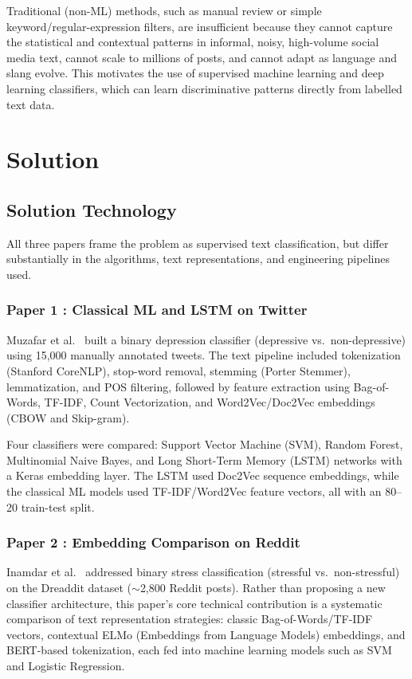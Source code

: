 \documentclass[a4paper,12pt]{article}
\begin{document}
Traditional (non-ML) methods, such as manual review or simple keyword/regular-expression filters, are insufficient because they cannot capture the statistical and contextual patterns in informal, noisy, high-volume social media text, cannot scale to millions of posts, and cannot adapt as language and slang evolve. This motivates the use of supervised machine learning and deep learning classifiers, which can learn discriminative patterns directly from labelled text data.

\section{Solution}
\subsection{Solution Technology}
All three papers frame the problem as supervised text classification, but differ substantially in the algorithms, text representations, and engineering pipelines used.

\subsubsection*{Paper 1 : Classical ML and LSTM on Twitter}

Muzafar et al.~\cite{muzafar2023} built a binary depression classifier (depressive vs.\ non-depressive) using 15,000 manually annotated tweets. The text pipeline included tokenization (Stanford CoreNLP), stop-word removal, stemming (Porter Stemmer), lemmatization, and POS filtering, followed by feature extraction using Bag-of-Words, TF-IDF, Count Vectorization, and Word2Vec/Doc2Vec embeddings (CBOW and Skip-gram).

Four classifiers were compared: Support Vector Machine (SVM), Random Forest, Multinomial Naive Bayes, and Long Short-Term Memory (LSTM) networks with a Keras embedding layer. The LSTM used Doc2Vec sequence embeddings, while the classical ML models used TF-IDF/Word2Vec feature vectors, all with an 80--20 train-test split.

\subsubsection*{Paper 2 : Embedding Comparison on Reddit}

Inamdar et al.~\cite{inamdar2023} addressed binary stress classification (stressful vs.\ non-stressful) on the Dreaddit dataset ($\sim$2,800 Reddit posts). Rather than proposing a new classifier architecture, this paper's core technical contribution is a systematic comparison of text representation strategies: classic Bag-of-Words/TF-IDF vectors, contextual ELMo (Embeddings from Language Models) embeddings, and BERT-based tokenization, each fed into machine learning models such as SVM and Logistic Regression.
\end{document}
